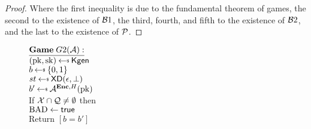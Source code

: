 \begin{proof}
Where the first inequality is due to the fundamental theorem of games, the second to the existence of ${\cal B}1$, the third, fourth, and fifth to the existence of ${\cal B}2$,
and the last to the existence of ${\cal P}$.
\end{proof}


\begin{figure}[tbhp]
\begin{center}
{
$\gamev{G2}{\advA}$\\
 $(\pk,\sk)\getsr\Kgen$\\
 $b \getsr \bits$ \\
 $st \getsr \mdalg(\epsilon,\bot)$\\
 $b' \getsr \advA^{\encOracle,H}(\pk)$\\
 If $\mathcal{X} \cap \mathcal{Q} \neq \emptyset$ then \\
\nudge $\mathrm{BAD} \gets\textsf{true}$\\
Return $[b=b']$\\ 

}
\end{center}
\end{figure}
